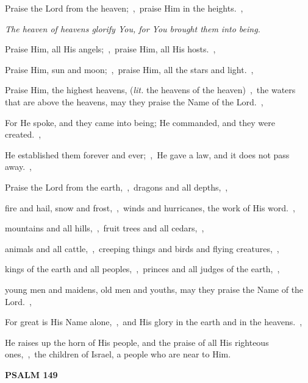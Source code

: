 \documentclass[12pt,twoside,a5paper]{article}
\newcommand{\psalm}[1]{\textbf{PSALM {#1}}\nopagebreak}
\newcommand{\qanona}[1]{{\liturgicalhint{Qanona.} \emph{#1}}}
\newcommand{\translationliteral}[1]{\emph{lit.} #1}
\begin{document}
\begin{normalparskip}
  Praise the Lord from the heaven;~\sep\ praise Him in the heights.~\sep

  \qanona{The heaven of heavens glorify You, for You brought them into being.}

  Praise Him, all His angels;~\sep\ praise Him, all His hosts.~\sep

  Praise Him, sun and moon;~\sep\ praise Him, all the stars and light.~\sep

  Praise Him, the highest heavens, (\translationliteral{the heavens of the heaven})~\sep\ the waters that are above the heavens, may they praise the Name of the Lord.~\sep

  For He spoke, and they came into being; He commanded, and they were created.~\sep

  He established them forever and ever;~\sep\ He gave a law, and it does not pass away.~\sep

  Praise the Lord from the earth,~\sep\ dragons and all depths,~\sep

  fire and hail, snow and frost,~\sep\ winds and hurricanes, the work of His word.~\sep

  mountains and all hills,~\sep\ fruit trees and all cedars,~\sep

  animals and all cattle,~\sep\ creeping things and birds and flying creatures,~\sep

  kings of the earth and all peoples,~\sep\ princes and all judges of the earth,~\sep

  young men and maidens, old men and youths, may they praise the Name of the Lord.~\sep

  For great is His Name alone,~\sep\ and His glory in the earth and in the heavens.~\sep

  He raises up the horn of His people, and the praise of all His righteous ones,~\sep\ the children of Israel, a people who are near to Him.
\end{normalparskip}

\psalm{149}
\end{document}

